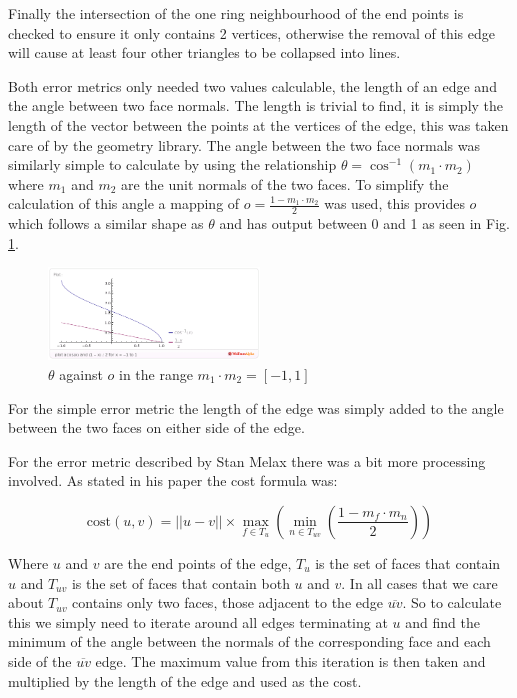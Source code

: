     Finally the intersection of the one ring neighbourhood of the end points is
    checked to ensure it only contains 2 vertices, otherwise the removal of this
    edge will cause at least four other triangles to be collapsed into lines.
    
    Both error metrics only needed two values calculable, the length
    of an edge and the angle between two face normals.  The length is trivial to
    find, it is simply the length of the vector between the points at the
    vertices of the edge, this was taken care of by the geometry library.  The
    angle between the two face normals was similarly simple to calculate by
    using the relationship $\theta = \cos^{-1}\left(m_1 \cdot m_2\right)$ where
    $m_1$ and $m_2$ are the unit normals of the two faces.  To simplify the
    calculation of this angle a mapping of $o = \frac{1 - m_1 \cdot m_2}{2}$ was
    used, this provides $o$ which follows a similar shape as $\theta$ and has
    output between 0 and 1 as seen in Fig. \ref{theta-vs-o}.

    \begin{figure}
      \centering
      \includegraphics[width=0.5\textwidth]{images/theta-vs-o}
      \caption{$\theta$ against $o$ in the range $m_1 \cdot m_2 = [-1,1]$ \label{theta-vs-o}}
    \end{figure}

    For the simple error metric the length of the edge was simply added to the
    angle between the two faces on either side of the edge.

    For the error metric described by Stan Melax there was a bit more processing
    involved.  As stated in his paper the cost formula was:

    \begin{equation*}
      \text{cost} \left( u, v \right) =
            \left|\left|u - v\right|\right| \times
            \max_{f \in T_u} \left(
              \min_{n \in T_{uv}} \left(
                \frac{1 - m_f \cdot m_n}{2}
              \right)
            \right)
    \end{equation*}

    Where $u$ and $v$ are the end points of the edge, $T_u$ is the set of faces
    that contain $u$ and $T_{uv}$ is the set of faces that contain both $u$ and
    $v$.  In all cases that we care about $T_{uv}$ contains only two faces,
    those adjacent to the edge $\overline{uv}$.  So to calculate this we simply
    need to iterate around all edges terminating at $u$ and find the minimum of
    the angle between the normals of the corresponding face and each side of the
    $\overline{uv}$ edge.  The maximum value from this iteration is then taken
    and multiplied by the length of the edge and used as the cost.

